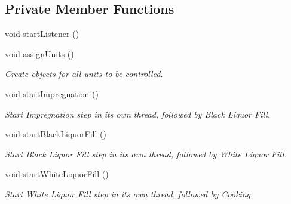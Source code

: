 \subsection*{Private Member Functions}
\begin{DoxyCompactItemize}
\item 
void \hyperlink{class_a_s_e6030_1_1_controller_ac13cb64488eb479527e08d4af8f29869}{start\+Listener} ()
\item 
\mbox{\label{class_a_s_e6030_1_1_controller_a1a0e5a9d392358ae55514c201631591c}} 
void \hyperlink{class_a_s_e6030_1_1_controller_a1a0e5a9d392358ae55514c201631591c}{assign\+Units} ()
\begin{DoxyCompactList}\small\item\em Create objects for all units to be controlled. \end{DoxyCompactList}\item 
\mbox{\label{class_a_s_e6030_1_1_controller_aaad2a679e6a2f5db4193f58fd7482def}} 
void \hyperlink{class_a_s_e6030_1_1_controller_aaad2a679e6a2f5db4193f58fd7482def}{start\+Impregnation} ()
\begin{DoxyCompactList}\small\item\em Start Impregnation step in its own thread, followed by Black Liquor Fill. \end{DoxyCompactList}\item 
\mbox{\label{class_a_s_e6030_1_1_controller_ac60700638fa6ac183134d3e9b6aa1005}} 
void \hyperlink{class_a_s_e6030_1_1_controller_ac60700638fa6ac183134d3e9b6aa1005}{start\+Black\+Liquor\+Fill} ()
\begin{DoxyCompactList}\small\item\em Start Black Liquor Fill step in its own thread, followed by White Liquor Fill. \end{DoxyCompactList}\item 
\mbox{\label{class_a_s_e6030_1_1_controller_a4e3027f9fd319e634cc11b9b9cc680c4}} 
void \hyperlink{class_a_s_e6030_1_1_controller_a4e3027f9fd319e634cc11b9b9cc680c4}{start\+White\+Liquor\+Fill} ()
\begin{DoxyCompactList}\small\item\em Start White Liquor Fill step in its own thread, followed by Cooking. \end{DoxyCompactList}\item 

\end{DoxyCompactItemize}
